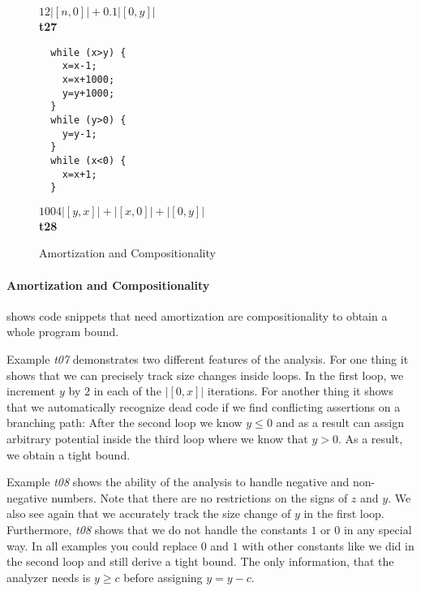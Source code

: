 \documentclass[nocopyrightspace,preprint]{sigplanconf}
\newcommand{\pref}[1]{\prettyref{#1}}
\begin{document}
\begin{figure*}[t!]
\begin{minipage}[b]{\progwidth}
\begin{center}
$12|[n,0]| + 0.1|[0,y]|$
\\[.7\baselineskip]
      {\bf t27}
    \end{center}
  \end{minipage}
%
%
%
  \begin{minipage}[b]{\progwidth}
    \begin{center}
   \begin{lstlisting}
  while (x>y) {
    x=x-1;
    x=x+1000;
    y=y+1000;
  }
  while (y>0) {
    y=y-1;
  }
  while (x<0) {
    x=x+1;
  }
   \end{lstlisting}

$1004|[y,x]|+|[x,0]|+|[0,y]|$
\\[.7\baselineskip]
      {\bf t28}
    \end{center}
  \end{minipage}


   \caption{Amortization and Compositionality}
  \label{fig:cat1}
\end{figure*}

\paragraph{Amortization and Compositionality}

\pref{fig:cat1} shows code snippets that need amortization are
compositionality to obtain a whole program bound.  

Example \emph{t07} demonstrates two different features of the
analysis.  For one thing it shows that we can precisely track size
changes inside loops.  In the first loop, we increment $y$ by $2$ in
each of the $|[0,x]|$ iterations.  For another thing it shows that we
automatically recognize dead code if we find conflicting assertions on
a branching path: After the second loop we know $y \leq 0$ and as a
result can assign arbitrary potential inside the third loop where we
know that $y>0$.  As a result, we obtain a tight bound.

Example \emph{t08} shows the ability of the analysis to handle
negative and non-negative numbers.  Note that there are no
restrictions on the signs of $z$ and $y$.  We also see again that we
accurately track the size change of $y$ in the first loop.
Furthermore, \emph{t08} shows that we do not handle the constants $1$
or $0$ in any special way.  In all examples you could replace $0$ and
$1$ with other constants like we did in the second loop and still
derive a tight bound.  The only information, that the analyzer needs
is $y \geq c$ before assigning $y = y - c$.
\end{document}
